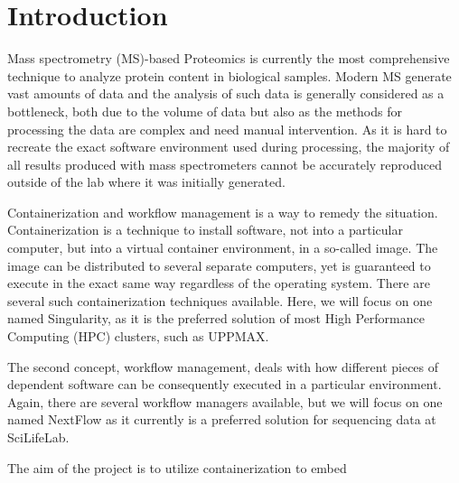 \section{Introduction}

Mass spectrometry (MS)-based Proteomics is currently the most comprehensive technique to analyze protein content in biological samples. Modern MS generate vast amounts of data and the analysis of such data is generally considered as a bottleneck, both due to the volume of data but also as the methods for processing the data are complex and need manual intervention. As it is hard to recreate the exact software environment used during processing, the majority of all results produced with mass spectrometers cannot be accurately reproduced outside of the lab where it was initially generated.

Containerization and workflow management is a way to remedy the situation. Containerization is a technique to install software, not into a particular computer, but into a virtual container environment, in a so-called image. The image can be distributed to several separate computers, yet is guaranteed to execute in the exact same way regardless of the operating system. There are several such containerization techniques available. Here, we will focus on one named Singularity, as it is the preferred solution of most High Performance Computing (HPC) clusters, such as UPPMAX.

The second concept, workflow management, deals with how different pieces of dependent software can be consequently executed in a particular environment. Again, there are several workflow managers available, but we will focus on one named NextFlow as it currently is a preferred solution for sequencing data at SciLifeLab.

The aim of the project is to utilize containerization to embed 
